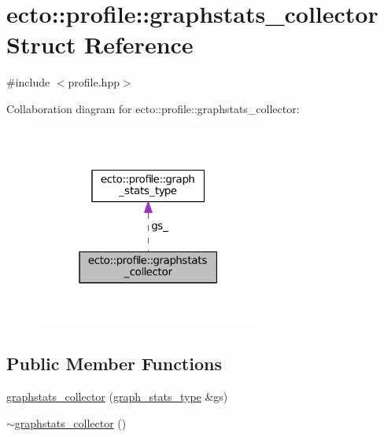 \hypertarget{structecto_1_1profile_1_1graphstats__collector}{}\section{ecto\+:\+:profile\+:\+:graphstats\+\_\+collector Struct Reference}
\label{structecto_1_1profile_1_1graphstats__collector}


{\ttfamily \#include $<$profile.\+hpp$>$}



Collaboration diagram for ecto\+:\+:profile\+:\+:graphstats\+\_\+collector\+:\nopagebreak
\begin{figure}[H]
\begin{center}
\leavevmode
\includegraphics[width=211pt]{structecto_1_1profile_1_1graphstats__collector__coll__graph}
\end{center}
\end{figure}
\subsection*{Public Member Functions}
\begin{DoxyCompactItemize}
\item 
\hyperlink{structecto_1_1profile_1_1graphstats__collector_a375c75ce1c0197d1d87a5fc1bdf97050}{graphstats\+\_\+collector} (\hyperlink{structecto_1_1profile_1_1graph__stats__type}{graph\+\_\+stats\+\_\+type} \&gs)
\item 
\hyperlink{structecto_1_1profile_1_1graphstats__collector_a1bc967dcde1e3418aeeb10e58a52d79f}{$\sim$graphstats\+\_\+collector} ()
\end{DoxyCompactItemize}
